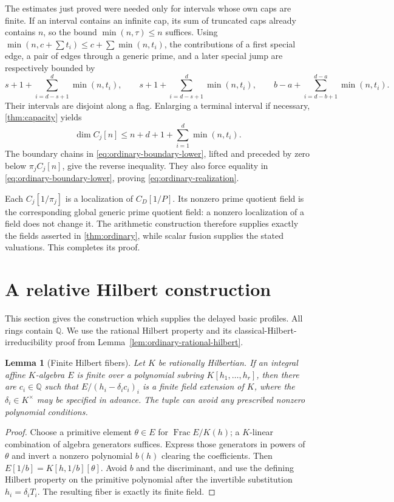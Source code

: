 \documentclass[11pt,reqno]{amsart}
\numberwithin{equation}{section}
\theoremstyle{plain}
\newtheorem{lemma}[theorem]{Lemma}
\theoremstyle{definition}
\theoremstyle{remark}
\begin{document}
The estimates just proved were needed only for intervals
whose own caps are finite. If an interval contains an
infinite cap, its sum of truncated caps already contains
\(n\), so the bound \(\min(n,\tau)\le n\) suffices.
Using
\(\min(n,c+\sum t_i)\le c+\sum\min(n,t_i)\), the contributions
of a first special edge, a pair of edges through a generic
prime, and a later special jump are respectively bounded by
\[
 s+1+\sum_{i=d-s+1}^{d}\min(n,t_i),\qquad
 s+1+\sum_{i=d-s+1}^{d}\min(n,t_i),\qquad
 b-a+\sum_{i=d-b+1}^{d-a}\min(n,t_i).
\]
Their intervals are disjoint along a flag. Enlarging a
terminal interval if necessary, \cref{thm:capacity} yields
\[
 \dim C_j[n]\le n+d+1+\sum_{i=1}^{d}\min(n,t_i).
\]
The boundary chains in \eqref{eq:ordinary-boundary-lower},
lifted and preceded by zero below \(\pi_jC_j[n]\), give
the reverse inequality. They also force equality in
\eqref{eq:ordinary-boundary-lower}, proving
\eqref{eq:ordinary-realization}.

Each \(C_j[1/\pi_j]\) is a localization of \(C_D[1/P]\).
Its nonzero prime quotient field is the corresponding global
generic prime quotient field: a nonzero localization of a
field does not change it. The arithmetic construction
therefore supplies exactly the fields asserted in
\cref{thm:ordinary}, while scalar fusion supplies the stated
valuations. This completes its proof.

\section{A relative Hilbert construction}
\label{sec:relative}

This section gives the construction which supplies the delayed basic
profiles.  All rings contain \(\mathbb Q\).  We use the rational
Hilbert property and its classical-Hilbert-irreducibility proof from
Lemma~\ref{lem:ordinary-rational-hilbert}.

\begin{lemma}[Finite Hilbert fibers]\label{lem:relative-hit}
Let \(K\) be rationally Hilbertian.  If an integral affine
\(K\)-algebra \(E\) is finite over a polynomial subring
\(K[h_1,\ldots,h_r]\), then there are \(c_i\in\mathbb Q\) such that
\(E/(h_i-\delta_i c_i)_i\) is a finite field extension of \(K\),
where the \(\delta_i\in K^\times\) may be specified in advance.
The tuple can avoid any prescribed nonzero polynomial conditions.
\end{lemma}

\begin{proof}
Choose a primitive element \(\theta\in E\) for
\(\operatorname{Frac}E/K(h)\); a \(K\)-linear combination of
algebra generators suffices.  Express those generators in powers
of \(\theta\) and invert a nonzero polynomial \(b(h)\) clearing
the coefficients.  Then \(E[1/b]=K[h,1/b][\theta]\).
Avoid \(b\) and the discriminant, and use
the defining Hilbert property on the primitive polynomial after the
invertible substitution \(h_i=\delta_iT_i\).  The resulting fiber
is exactly its finite field.
\end{proof}
\end{document}
